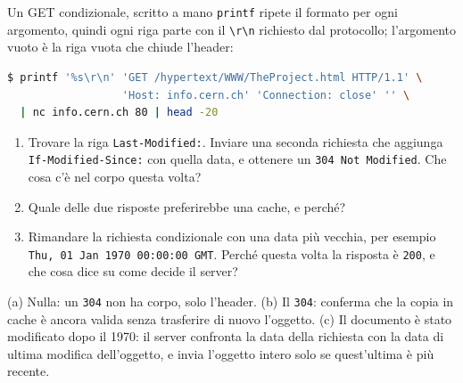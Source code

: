 \begin{esercizio}{Un GET condizionale, scritto a mano}
\texttt{printf} ripete il formato per ogni argomento, quindi ogni riga parte con il \verb|\r\n| richiesto dal protocollo; l'argomento
vuoto è la riga vuota che chiude l'header:
\begin{lstlisting}[language=bash]
$ printf '%s\r\n' 'GET /hypertext/WWW/TheProject.html HTTP/1.1' \
                  'Host: info.cern.ch' 'Connection: close' '' \
  | nc info.cern.ch 80 | head -20
\end{lstlisting}
\begin{enumerate}[label=(\alph*)]
    \item Trovare la riga \texttt{Last-Modified:}. Inviare una seconda richiesta che aggiunga \texttt{If-Modified-Since:} con quella data,
          e ottenere un \texttt{304 Not Modified}. Che cosa c'è nel corpo questa volta?
    \item Quale delle due risposte preferirebbe una cache, e perché?
    \item Rimandare la richiesta condizionale con una data più vecchia, per esempio \texttt{Thu, 01 Jan 1970 00:00:00 GMT}. Perché questa
          volta la risposta è \texttt{200}, e che cosa dice su come decide il server?
\end{enumerate}

\svolgimento
(a) Nulla: un \texttt{304} non ha corpo, solo l'header. (b) Il \texttt{304}: conferma che la copia in cache è ancora valida senza
trasferire di nuovo l'oggetto. (c) Il documento è stato modificato dopo il 1970: il server confronta la data della richiesta con la data
di ultima modifica dell'oggetto, e invia l'oggetto intero solo se quest'ultima è più recente.
\end{esercizio}

